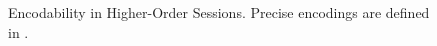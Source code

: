 \begin{figure}[t]
%
	\caption{Encodability in Higher-Order Sessions. 
	Precise encodings are defined in .
	\label{fig:express}}
\Hlinefig
\end{figure}

\smallskip

